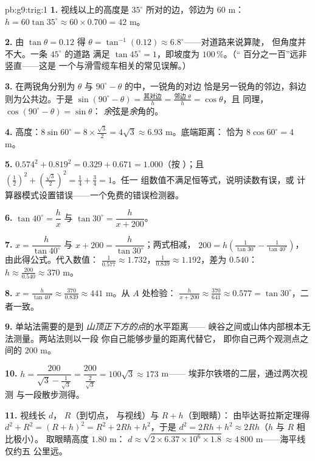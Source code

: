 \begin{solution}{pb:g9:trig:1}
\textbf{1.} 视线以上的高度是
$35^\circ$ 所对的边，邻边为 $60$ m：
$h = 60 \tan 35^\circ \approx 60 \times 0.700 = 42$ m。

\textbf{2.} 由 $\tan\theta = 0.12$ 得
$\theta = \tan^{-1}(0.12) \approx 6.8^\circ$——对道路来说算陡，
但角度并不大。一条 $45^\circ$ 的道路
满足 $\tan 45^\circ = 1$，即坡度为 $100\,\%$。（“
百分之一百”远非竖直——这是
一个与滑雪缆车相关的常见误解。）

\textbf{3.} 在两锐角分别为 $\theta$ 与
$90^\circ - \theta$ 的中，一锐角的对边
恰是另一锐角的邻边，斜边则为公共边。于是
$\sin(90^\circ - \theta) = \frac{\text{其对边}}{h} =
\frac{\text{邻边 }\theta}{h} = \cos\theta$，且
同理，$\cos(90^\circ - \theta) = \sin\theta$：
\emph{余}弦是\emph{余}角的。

\textbf{4.} 高度：$8 \sin 60^\circ = 8 \times
\frac{\sqrt3}{2} = 4\sqrt3 \approx 6.93$ m。底端距离：
恰为 $8 \cos 60^\circ = 4$ m。

\textbf{5.} $0.574^2 + 0.819^2 = 0.329 + 0.671 = 1.000$（按
）；且 $\left(\frac12\right)^2 +
\left(\frac{\sqrt3}{2}\right)^2 = \frac14 + \frac34 = 1$。任一
组数值不满足恒等式，说明读数有误，或
计算器模式设置错误——一个免费的错误检测器。

\textbf{6.} $\tan 40^\circ = \dfrac hx$ 与
$\tan 30^\circ = \dfrac{h}{x + 200}$。

\textbf{7.} $x = \dfrac{h}{\tan 40^\circ}$ 与
$x + 200 = \dfrac{h}{\tan 30^\circ}$；两式相减，
$200 = h\left(\frac{1}{\tan 30^\circ} -
\frac{1}{\tan 40^\circ}\right)$，由此得公式。代入数值：
$\frac{1}{0.577} \approx 1.732$，$\frac{1}{0.839} \approx
1.192$，差为 $0.540$：
$h \approx \frac{200}{0.540} \approx 370$ m。

\textbf{8.} $x = \frac{h}{\tan 40^\circ} \approx
\frac{370}{0.839} \approx 441$ m。从 $A$ 处检验：
$\frac{h}{x + 200} \approx \frac{370}{641} \approx 0.577 =
\tan 30^\circ$，二者一致。

\textbf{9.} 单站法需要的是到
\emph{山顶正下方的点}的水平距离——
峡谷之间或山体内部根本无法测量。两站法则以一段
你自己能够步量的距离代替它，
即你自己两个观测点之间的 $200$ m。

\textbf{10.} $h = \dfrac{200}{\sqrt3 - \frac{1}{\sqrt3}}
= \dfrac{200}{\frac{2}{\sqrt3}} = 100\sqrt3 \approx 173$ m——
埃菲尔铁塔的二层，通过两次视测
与一段散步测得。

\textbf{11.} 视线长 $d$， $R$（到切点，
与视线）与 $R + h$（到眼睛）：
由毕达哥拉斯定理得 $d^2 + R^2 = (R + h)^2 = R^2 + 2Rh + h^2$，于是
$d^2 = 2Rh + h^2 \approx 2Rh$（$h$ 与 $R$ 相比极小）。
取眼睛高度 $1.80$ m：
$d \approx \sqrt{2 \times 6.37 \times 10^6 \times 1.8}
\approx 4\,800$ m——海平线仅约五
公里远。


\end{solution}
